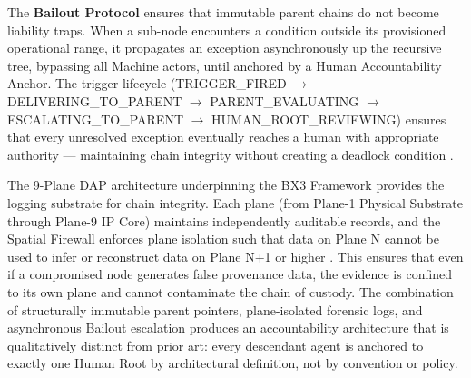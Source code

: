 The \textbf{Bailout Protocol} ensures that immutable parent chains do not become liability traps. When a sub-node encounters a condition outside its provisioned operational range, it propagates an exception asynchronously up the recursive tree, bypassing all Machine actors, until anchored by a Human Accountability Anchor. The trigger lifecycle (TRIGGER\_FIRED $\rightarrow$ DELIVERING\_TO\_PARENT $\rightarrow$ PARENT\_EVALUATING $\rightarrow$ ESCALATING\_TO\_PARENT $\rightarrow$ HUMAN\_ROOT\_REVIEWING) ensures that every unresolved exception eventually reaches a human with appropriate authority — maintaining chain integrity without creating a deadlock condition \cite{bx3_universal_spec_2026}.

The 9-Plane DAP architecture underpinning the BX3 Framework provides the logging substrate for chain integrity. Each plane (from Plane-1 Physical Substrate through Plane-9 IP Core) maintains independently auditable records, and the Spatial Firewall enforces plane isolation such that data on Plane N cannot be used to infer or reconstruct data on Plane N+1 or higher \cite{bx3_universal_arch_2026}. This ensures that even if a compromised node generates false provenance data, the evidence is confined to its own plane and cannot contaminate the chain of custody. The combination of structurally immutable parent pointers, plane-isolated forensic logs, and asynchronous Bailout escalation produces an accountability architecture that is qualitatively distinct from prior art: every descendant agent is anchored to exactly one Human Root by architectural definition, not by convention or policy.




